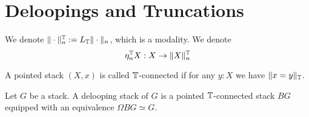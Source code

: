 
\section{Deloopings and Truncations}

We denote $\| \cdot \|_n^{\mathbb{T}} := L_{\mathbb{T}} \| \cdot \|_n$, which is a modality. We denote 
\[
\eta_n^{\mathbb{T}} X : X \to \| X\|_n^{\mathbb{T}}
\]
\begin{definition}
	A pointed stack $(X,x)$ is called $\mathbb{T}$-connected if for any $y : X$ we have $\|x = y\|_{\mathbb{T}}$.
\end{definition}
\begin{definition}
	Let $G$ be a stack. A delooping stack of $G$ is a  pointed $\mathbb{T}$-connected stack $B G$ equipped with an equivalence $\Omega B G \simeq G$.
\end{definition}

